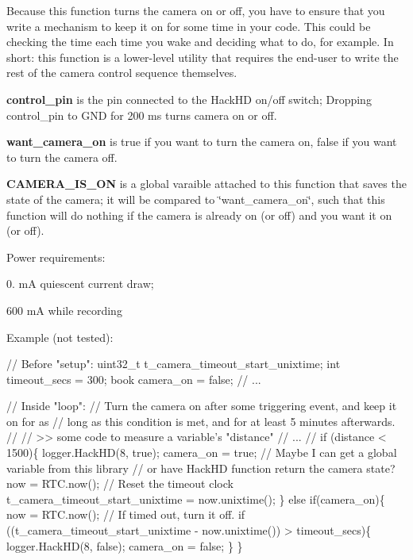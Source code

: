Because this function turns the camera on or off, you have to ensure that you write a mechanism to keep it on for some time in your code. This could be checking the time each time you wake and deciding what to do, for example. In short\+: this function is a lower-\/level utility that requires the end-\/user to write the rest of the camera control sequence themselves.

{\bfseries control\+\_\+pin} is the pin connected to the Hack\+HD on/off switch; Dropping control\+\_\+pin to G\+ND for 200 ms turns camera on or off.

{\bfseries want\+\_\+camera\+\_\+on} is true if you want to turn the camera on, false if you want to turn the camera off.

{\bfseries C\+A\+M\+E\+R\+A\+\_\+\+I\+S\+\_\+\+ON} is a global varaible attached to this function that saves the state of the camera; it will be compared to \char`\"{}want\+\_\+camera\+\_\+on\char`\"{}, such that this function will do nothing if the camera is already on (or off) and you want it on (or off).

Power requirements\+:


\begin{DoxyItemize}
\item 0. mA quiescent current draw;
\item 600 mA while recording
\end{DoxyItemize}

Example (not tested)\+:


\begin{DoxyCode}
\textcolor{comment}{// Before "setup":}
uint32\_t t\_camera\_timeout\_start\_unixtime;
\textcolor{keywordtype}{int} timeout\_secs = 300;
book camera\_on = \textcolor{keyword}{false};
\textcolor{comment}{// ...}

\textcolor{comment}{// Inside "loop":}
\textcolor{comment}{// Turn the camera on after some triggering event, and keep it on for as }
\textcolor{comment}{// long as this condition is met, and for at least 5 minutes afterwards.}
\textcolor{comment}{// }
\textcolor{comment}{// >> some code to measure a variable's "distance"}
\textcolor{comment}{// ...}
\textcolor{comment}{// }
\textcolor{keywordflow}{if} (distance < 1500)\{
  logger.HackHD(8, \textcolor{keyword}{true});
  camera\_on = \textcolor{keyword}{true}; \textcolor{comment}{// Maybe I can get a global variable from this library}
                    \textcolor{comment}{// or have HackHD function return the camera state?}
  now = RTC.now();
  \textcolor{comment}{// Reset the timeout clock}
  t\_camera\_timeout\_start\_unixtime = now.unixtime(); 
\}
\textcolor{keywordflow}{else} \textcolor{keywordflow}{if}(camera\_on)\{
  now = RTC.now();
  \textcolor{comment}{// If timed out, turn it off.}
  \textcolor{keywordflow}{if} ((t\_camera\_timeout\_start\_unixtime - now.unixtime()) > timeout\_secs)\{
    logger.HackHD(8, \textcolor{keyword}{false});
    camera\_on = \textcolor{keyword}{false};
  \}
\}
\end{DoxyCode}


